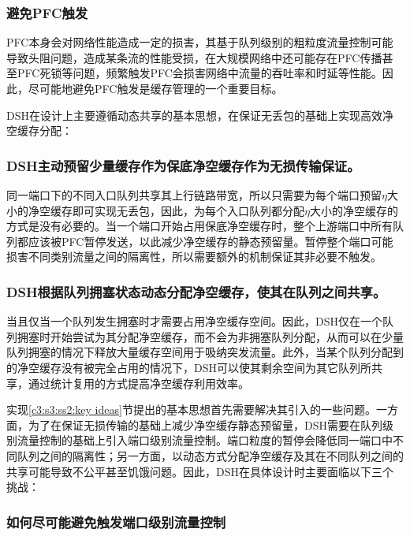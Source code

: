\subsubsection{避免PFC触发}

PFC本身会对网络性能造成一定的损害，其基于队列级别的粗粒度流量控制可能导致头阻问题，造成某条流的性能受损，在大规模网络中还可能存在PFC传播甚至PFC死锁等问题，频繁触发PFC会损害网络中流量的吞吐率和时延等性能。因此，尽可能地避免PFC触发是缓存管理的一个重要目标。

\label{c3:s3:ss2:key ideas}

DSH在设计上主要遵循动态共享的基本思想，在保证无丢包的基础上实现高效净空缓存分配：

\subsubsection{DSH主动预留少量缓存作为保底净空缓存作为无损传输保证。}

同一端口下的不同入口队列共享其上行链路带宽，所以只需要为每个端口预留$\eta$大小的净空缓存即可实现无丢包，因此，为每个入口队列都分配$\eta$大小的净空缓存的方式是没有必要的。当一个端口开始占用保底净空缓存时，整个上游端口中所有队列都应该被PFC暂停发送，以此减少净空缓存的静态预留量。暂停整个端口可能损害不同类别流量之间的隔离性，所以需要额外的机制保证其非必要不触发。

\subsubsection{DSH根据队列拥塞状态动态分配净空缓存，使其在队列之间共享。}

当且仅当一个队列发生拥塞时才需要占用净空缓存空间。因此，DSH仅在一个队列拥塞时开始尝试为其分配净空缓存，而不会为非拥塞队列分配，从而可以在少量队列拥塞的情况下释放大量缓存空间用于吸纳突发流量。此外，当某个队列分配到的净空缓存没有被完全占用的情况下，DSH可以使其剩余空间为其它队列所共享，通过统计复用的方式提高净空缓存利用效率。


实现\ref{c3:s3:ss2:key ideas}节提出的基本思想首先需要解决其引入的一些问题。一方面，为了在保证无损传输的基础上减少净空缓存静态预留量，DSH需要在队列级别流量控制的基础上引入端口级别流量控制。端口粒度的暂停会降低同一端口中不同队列之间的隔离性；另一方面，以动态方式分配净空缓存及其在不同队列之间的共享可能导致不公平甚至饥饿问题。因此，DSH在具体设计时主要面临以下三个挑战：

\subsubsection{如何尽可能避免触发端口级别流量控制}


